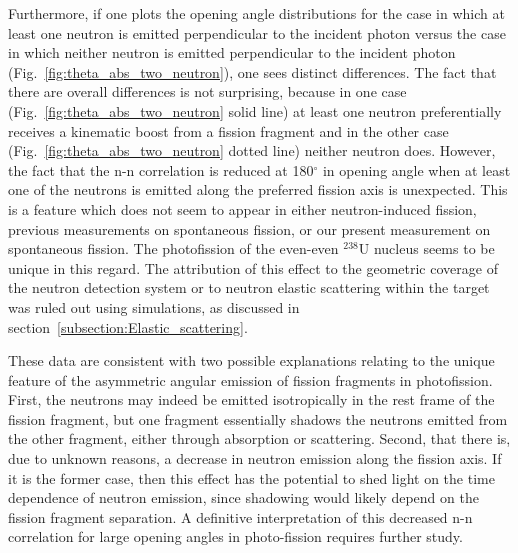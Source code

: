 Furthermore, if one plots the opening angle distributions for the case in which at least one neutron is emitted perpendicular to the incident photon versus the case in which neither neutron is emitted perpendicular to the incident photon (Fig.~\ref{fig:theta_abs_two_neutron}), one sees distinct differences.
The fact that there are overall differences is not surprising, because in one case (Fig.~\ref{fig:theta_abs_two_neutron} solid line) at least one neutron preferentially receives a kinematic boost from a fission fragment and in the other case (Fig.~\ref{fig:theta_abs_two_neutron} dotted line) neither neutron does.
However, the fact that the n-n correlation is reduced at 180$^{\circ}$ in opening angle when at least one of the neutrons is emitted along the preferred fission axis is unexpected.
This is a feature which does not seem to appear in either neutron-induced fission, previous measurements on spontaneous fission, or our present measurement on spontaneous fission.
The photofission of the even-even $^{238}$U nucleus seems to be unique in this regard. 
The attribution of this effect to the geometric coverage of the neutron detection system or to neutron elastic scattering within the target was ruled out using simulations, as discussed in section~\ref{subsection:Elastic_scattering}.

These data are consistent with two possible explanations relating to the unique feature of the asymmetric angular emission of fission fragments in photofission.
First, the neutrons may indeed be emitted isotropically in the rest frame of the fission fragment, but one fragment essentially shadows the neutrons emitted from the other fragment, either through absorption or scattering.
Second, that there is, due to unknown reasons, a decrease in neutron emission along the fission axis.
If it is the former case, then this effect has the potential to shed light on the time dependence of neutron emission, since shadowing would likely depend on the fission fragment separation.
A definitive interpretation of this decreased n-n correlation for large opening angles in photo-fission requires further study.

